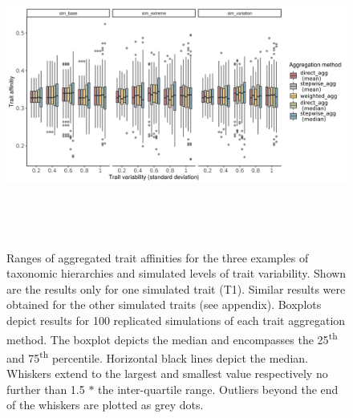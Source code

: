\documentclass{article}
\begin{document}
\begin{figure}[H]
  \centering
  \includegraphics[width=16.5cm, height=10cm]{Overview_sim_results.png}
  \caption{Ranges of aggregated trait affinities for the three examples of taxonomic hierarchies and simulated levels of trait variability. Shown are the results only for one simulated trait (T1). Similar results were obtained for the other simulated traits (see appendix).  Boxplots depict results for 100 replicated simulations of each trait aggregation method. The boxplot depicts the median and encompasses the 25\textsuperscript{th} and 75\textsuperscript{th} percentile. Horizontal black lines depict the median. Whiskers extend to the largest and smallest value respectively no further than 1.5 $*$ the inter-quartile range. Outliers beyond the end of the whiskers are plotted as grey dots.}
  \label{fig:overview_sim_results}
\end{figure}
\end{document}
